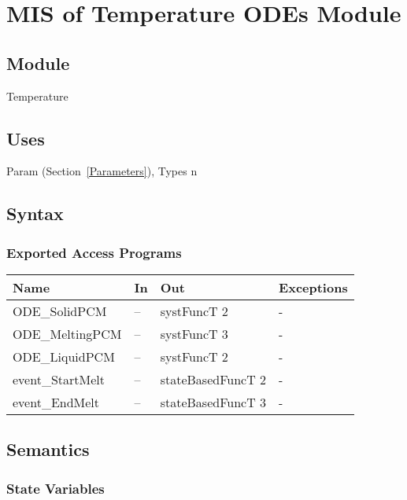 \documentclass[12pt]{article}
\begin{document}
\newpage
\section{MIS of Temperature ODEs Module} \label{Temperature}

\subsection{Module}

Temperature

\subsection{Uses}

Param (Section~\ref{Parameters}), Types n

\subsection{Syntax}

\subsubsection{Exported Access Programs}

\begin{center}
\begin{tabular}{p{3.5cm} p{1cm} p{7cm} p{2cm}}
\hline
\textbf{Name} & \textbf{In} & \textbf{Out} & \textbf{Exceptions} \\
\hline
ODE\_SolidPCM & -- & systFuncT 2 & - \\
\hline
ODE\_MeltingPCM & -- & systFuncT 3& - \\
\hline
ODE\_LiquidPCM & -- & systFuncT 2 & - \\
\hline
event\_StartMelt & -- & stateBasedFuncT 2 & - \\
\hline
event\_EndMelt & -- & stateBasedFuncT 3 & - \\
\hline
\end{tabular}
\end{center}

\subsection{Semantics}

\subsubsection{State Variables}
\end{document}
